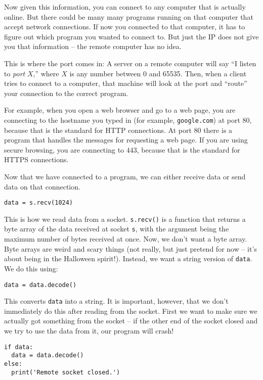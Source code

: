 \documentclass[11pt]{cselabheader}
\begin{document}
Now given this information, you can connect to any computer that is actually
online. But there could be many many programs running on that computer that
accept network connections. If now you connected to that computer, it has to
figure out which program you wanted to connect to. But just the IP does not give
you that information -- the remote computer has no idea.

This is where the port comes in: A server on a remote computer will say ``I
listen to \emph{port} $X$,'' where $X$ is any number between 0 and 65535. Then,
when a client tries to connect to a computer, that machine will look at the port
and ``route'' your connection to the correct program.

For example, when you open a web browser and go to a web page, you are
connecting to the hostname you typed in (for example, \texttt{google.com}) at
port $80$, because that is the standard for HTTP connections. At port $80$ there
is a program that handles the messages for requesting a web page. If you are
using secure browsing, you are connecting to $443$, because that is the standard
for HTTPS connections.

Now that we have connected to a program, we can either receive data or send data
on that connection. 

\begin{lstlisting}
data = s.recv(1024)
\end{lstlisting}

This is how we read data from a socket. \lstinline{s.recv()} is a function that
returns a byte array of the data received at socket \lstinline{s}, with the
argument being the maximum number of bytes received at once. Now, we don't want
a byte array. Byte arrays are weird and scary things (not really, but just
pretend for now -- it's about being in the Halloween spirit!). Instead, we want
a string version of \lstinline{data}. We do this using:

\begin{lstlisting}
data = data.decode()
\end{lstlisting}

This converts \lstinline{data} into a string. It is important, however, that we
don't immediately do this after reading from the socket. First we want to make
sure we actually got something from the socket -- if the other end of the socket
closed and we try to use the data from it, our program will crash!

\begin{lstlisting}
if data:
  data = data.decode()
else:
  print('Remote socket closed.')
\end{lstlisting}
\end{document}
